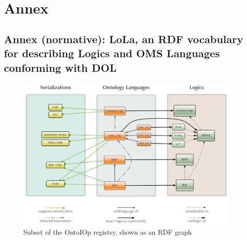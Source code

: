 \documentclass[10pt,fleqn,%
\ifpretendfinal
final%
\else
draft%
\fi,
]{scrreprt}
\makeatletter
\newcommand*\CommentAuthor{}
\renewcommand*\CommentAuthor{#1}}
\newcommand*\CommentDate{}
\renewcommand*\CommentDate{#1}}
\newcommand*\CommentId{}
\renewcommand*\CommentId{#1}}
\newcommand*\CommentType{}
\renewcommand*\CommentType{#1}}
\newcommand*{\SetCommentColorByType}[1]{%
\edef\localType{{#1}}%
\expandafter\ifstrequal\localType{q-aut}{\colorlet{CommentColor}{red}}{%
\expandafter\ifstrequal\localType{q-all}{\colorlet{CommentColor}{orange}}{%
\expandafter\ifstrequal\localType{todo}{\colorlet{CommentColor}{orange}}{%
\expandafter\ifstrequal\localType{fyi}{\colorlet{CommentColor}{lightgray}}{%
\colorlet{CommentColor}{yellow}}}}}}
\newcommand*{\SetCommentPrefixByType}[1]{%
\edef\localType{{#1}}%
\expandafter\@ifmtarg\localType{%
\edef\CommentPrefix{}%
}{%
\caseupper[q]{#1}%
\edef\CommentPrefix{\thestring: }%
}}
\newcommand*{\initComment}[1]{%
\setkeys{Comment}{#1}%
\SetCommentColorByType{\CommentType}%
\relax%
\SetCommentPrefixByType{\CommentType}%
\relax%
}
\newcommand*{\todonote}[2][]{%
\initComment{#1}%
\pdfcomment[author=\CommentAuthor,color=CommentColor,date=\CommentDate,id=\CommentId]{%
\CommentPrefix
#2}}
\renewcommand*{\todonote}[2][]{%
\initComment{#1}%
\ednote{\CommentPrefix #2}}
\newcommand*{\CL}{\ensuremath{\mathsf{CL}}\xspace}
\newcommand{\sclause}[1]{\section{#1}}
\makeatother
\begin{document}
%
%






\part*{Annex}

\appendix

\chapter[LoLa RDF Vocabulary]{Annex (normative): LoLa, an RDF vocabulary for describing Logics and OMS Languages conforming with DOL}\label{a:lola}

\begin{figure}
  \centering
   \includegraphics[width=\textwidth]{illustrations/DOL-ontograph-layers-ISO} 
  \caption{Subset of the OntoIOp registry, shown as an RDF graph}
\label{f:DOL-threelayers}
\end{figure}
\end{document}
